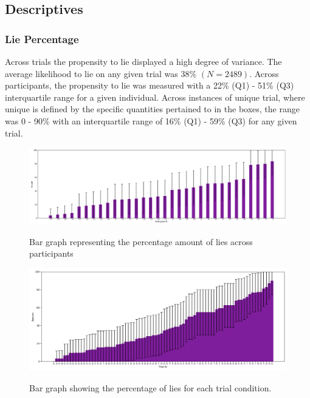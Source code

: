 \documentclass[man, floatsintext]{apa7}
\begin{document}
\subsection{Descriptives}

\subsubsection{Lie Percentage}

Across trials the propensity to lie displayed a high degree of variance. The average likelihood to lie on any given trial was 38\% $(N = 2489)$. Across participants, the propensity to lie was measured with a 22\% (Q1) - 51\% (Q3) interquartile range for a given individual. Across instances of unique trial, where unique is defined by the specific quantities pertained to in the boxes, the range was 0 - 90\% with an interquartile range of 16\% (Q1) - 59\% (Q3) for any given trial.

\begin{figure}[H]
	\includegraphics[width=\linewidth]{../plots/RESPONSE/PIDPercentLiesPlot.png}
	\label{fig:PIDPercentLiesPlot}
	\caption{Bar graph representing the percentage amount of lies across participants}
\end{figure}

\begin{figure}[H]
	\includegraphics[width=\linewidth]{../plots/RESPONSE/TRIALIDPercentLies.png}
	\label{fig:TRIALIDPercentLies}
	\caption{Bar graph showing the percentage of lies for each trial condition.}
\end{figure}
\end{document}
